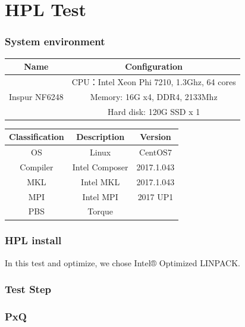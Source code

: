 \documentclass[conference,compsoc]{appendix/report}
\begin{document}

\section{HPL Test}
\subsubsection{System environment}
\begin{tabular}{|c|c|}
\hline
Name & Configuration \\
\hline
\multirow{3}{*}{Inspur NF6248 } & CPU：Intel Xeon Phi 7210, 1.3Ghz, 64 cores \\ 
& Memory: 16G x4, DDR4, 2133Mhz \\
& Hard disk: 120G SSD x 1\\
\hline
\end{tabular}
\newline
\newline

\noindent \begin{tabular}{|c|c|c|}
\hline
Classification & Description & Version \\
\hline
OS & Linux & CentOS7 \\
\hline
Compiler & Intel Composer & 2017.1.043 \\
\hline
MKL & Intel MKL & 2017.1.043 \\
\hline
MPI & Intel MPI & 2017 UP1 \\
\hline
PBS & Torque &\\
\hline
\end{tabular}
\newline
\newline
\newline
\subsubsection{HPL install}

In this test and optimize, we chose Intel® Optimized LINPACK. \\

\subsubsection{Test Step}

\subsubsection{PxQ}
\end{document}
